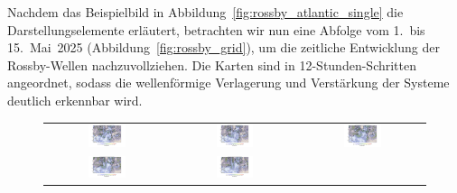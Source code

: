 Nachdem das Beispielbild in Abbildung~\ref{fig:rossby_atlantic_single} die 
Darstellungselemente erläutert, betrachten wir nun eine Abfolge vom 1.\ bis 15.\ Mai~2025 
(Abbildung~\ref{fig:rossby_grid}), um die zeitliche Entwicklung der Rossby-Wellen 
nachzuvollziehen. Die Karten sind in 12-Stunden-Schritten angeordnet, sodass die 
wellenförmige Verlagerung und Verstärkung der Systeme deutlich erkennbar wird.


\begin{figure}
	\centering
	\renewcommand{\arraystretch}{0.5}
	\begin{tabular}{ccc}
		\includegraphics[width=0.32\textwidth, trim=3.1cm 3cm 3.0cm 0.8cm, clip]{papers/rossby/images/data_2025_5_1_00:00_500.pdf} &
		\includegraphics[width=0.32\textwidth, trim=3.1cm 3cm 3.0cm 0.8cm, clip]{papers/rossby/images/data_2025_5_1_12:00_500.pdf} &
		\includegraphics[width=0.32\textwidth, trim=3.1cm 3cm 3.0cm 0.8cm, clip]{papers/rossby/images/data_2025_5_2_00:00_500.pdf}   \\
		\includegraphics[width=0.32\textwidth, trim=3.1cm 3cm 3.0cm 0.8cm, clip]{papers/rossby/images/data_2025_5_2_12:00_500.pdf} &
		\includegraphics[width=0.32\textwidth, trim=3.1cm 3cm 3.0cm 0.8cm, clip]{papers/rossby/images/data_2025_5_3_00:00_500.pdf} &

\end{tabular}
\end{figure}
